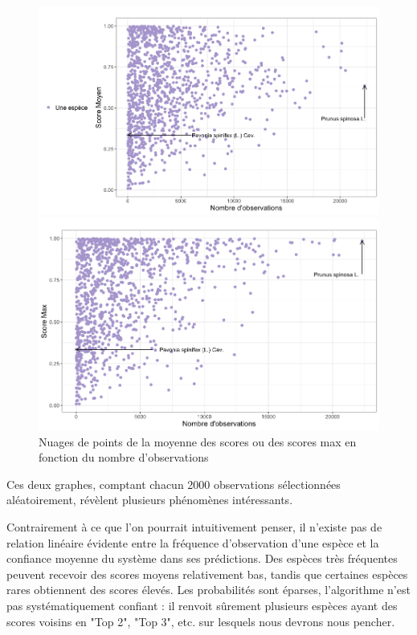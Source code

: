 \documentclass[a4paper,12pt]{article}
\begin{document}
\begin{figure}[H]
\centering
\begin{minipage}{0.5\textwidth}
  \includegraphics[width=0.9\linewidth]{images/mean_rd.png}
\end{minipage}%
\begin{minipage}{0.5\textwidth}
  \includegraphics[width=0.9\linewidth]{images/max_rd.png}
\end{minipage}
\caption{Nuages de points de la moyenne des scores ou des scores max en fonction du nombre d'observations}
\end{figure}

Ces deux graphes, comptant chacun 2000 observations sélectionnées aléatoirement, révèlent plusieurs phénomènes intéressants.

\vspace{0.2cm}

Contrairement à ce que l'on pourrait intuitivement penser, il n'existe pas de relation linéaire évidente entre la fréquence d'observation d'une espèce et la confiance moyenne du système dans ses prédictions. Des espèces très fréquentes peuvent recevoir des scores moyens relativement bas, tandis que certaines espèces rares obtiennent des scores élevés. Les probabilités sont éparses, l'algorithme n'est pas systématiquement confiant : il renvoit sûrement plusieurs espèces ayant des scores voisins en "Top 2", "Top 3", etc. sur lesquels nous devrons nous pencher.
\end{document}
